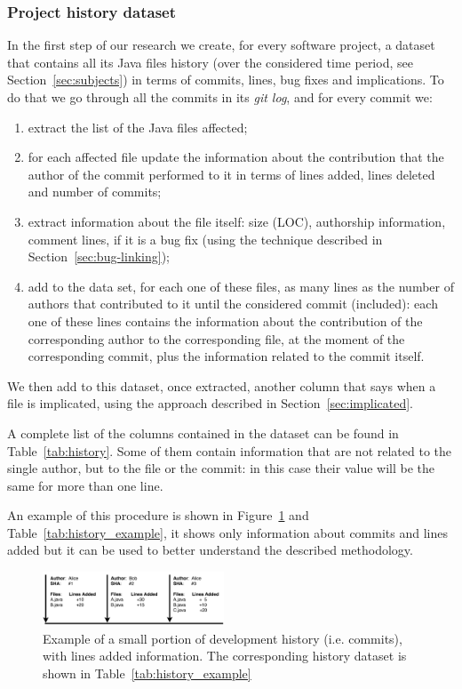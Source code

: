 \subsubsection{Project history dataset}
\label{sec:history-dataset}

In the first step of our research we create, for every software project, a dataset that contains all its Java files history (over the considered time period, see Section~\ref{sec:subjects}) in terms of commits, lines, bug fixes and implications. To do that we go through all the commits in its \textit{git log}, and for every commit we:
\begin{enumerate}
\item extract the list of the Java files affected; 
\item for each affected file update the information about the contribution that the author of the commit performed to it in terms of lines added, lines deleted and number of commits;
\item extract information about the file itself: size (LOC), authorship information, comment lines, if it is a bug fix (using the technique described in Section~\ref{sec:bug-linking});
\item add to the data set, for each one of these files, as many lines as the number of authors that contributed to it until the considered commit (included): each one of these lines contains the information about the contribution of the corresponding author to the corresponding file, at the moment of the corresponding commit, plus the information related to the commit itself.
\end{enumerate}

We then add to this dataset, once extracted, another column that says when a file is implicated, using the approach described in Section~\ref{sec:implicated}.

A complete list of the columns contained in the dataset can be found in Table~\ref{tab:history}. Some of them contain information that are not related to the single author, but to the file or the commit: in this case their value will be the same for more than one line.

An example of this procedure is shown in Figure~\ref{fig:history_example} and Table~\ref{tab:history_example}, it shows only information about commits and lines added but it can be used to better understand the described methodology.

\begin{figure}[ht]
    \centering
    \includegraphics[width=0.48\textwidth]{images/history_example.png}
    \caption{Example of a small portion of development history (i.e. commits), with lines added information. The corresponding history dataset is shown in Table~\ref{tab:history_example}}
    \label{fig:history_example}
\end{figure}

